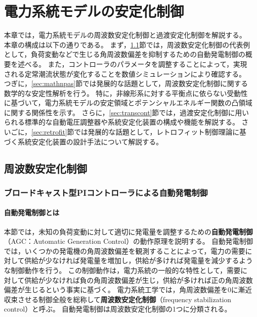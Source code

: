 \documentclass[tombow,dvipdfmx]{corona-a5-1.1}
\begin{document}
\chapter{電力系統モデルの安定化制御}\label{ch:stabcont}

本章では，電力系統モデルの周波数安定化制御と過渡安定化制御を解説する。
本章の構成は以下の通りである。
まず，\ref{sec:agcover}節では，周波数安定化制御の代表例として，負荷変動などで生じる角周波数偏差を抑制するための自動発電制御の概要を述べる。
また，コントローラのパラメータを調整することによって，実現される定常潮流状態が変化することを数値シミュレーションにより確認する。
つぎに，\ref{sec:mathnpas}節では発展的な話題として，周波数安定化制御に関する数学的な安定性解析を行う。
特に，非線形系に対する平衡点に依らない受動性に基づいて，電力系統モデルの安定領域とポテンシャルエネルギー関数の凸領域に関する関係性を示す。
さらに，\ref{sec:transcont}節では，過渡安定化制御に用いられる標準的な自動電圧調整器や系統安定化装置の構成や機能を解説する。
さいごに，\ref{sec:retrofit}節では発展的な話題として，レトロフィット制御理論に基づく系統安定化装置の設計手法について解説する。


\section{周波数安定化制御}\label{sec:agcover}
\subsection{ブロードキャスト型PIコントローラによる自動発電制御}\label{sec:broadPI}


\smallskip
\subsubsection{自動発電制御とは}

本節では，未知の負荷変動に対して適切に発電量を調整するための\textbf{自動発電制御}（AGC：Automatic Generation Control）の動作原理を説明する。
自動発電制御では，いくつかの発電機の角周波数偏差を観測することによって，電力の需要に対して供給が少なければ発電量を増加し，供給が多ければ発電量を減少するような制御動作を行う。
この制御動作は，電力系統の一般的な特性として，需要に対して供給が少なければ負の角周波数偏差が生じ，供給が多ければ正の角周波数偏差が生じるという事実に基づく。
電力系統工学では，角周波数偏差を0に漸近収束させる制御全般を総称して\textbf{周波数安定化制御}（frequency stabilization control）と呼ぶ。
自動発電制御は周波数安定化制御の1つに分類される。
\end{document}
